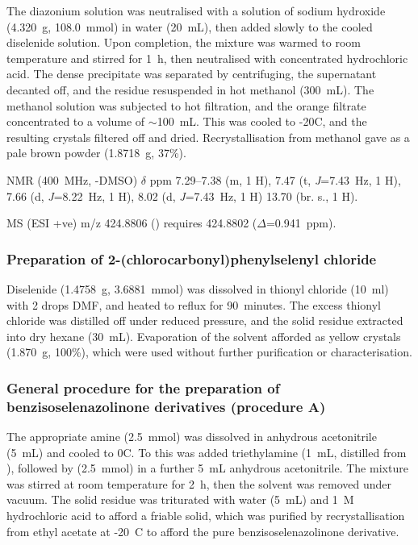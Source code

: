 \begin{refsection}
The diazonium solution was neutralised with a solution of sodium hydroxide (4.320~g, 108.0~mmol) in water (20~mL), then added slowly to the cooled diselenide solution.
Upon completion, the mixture was warmed to room temperature and stirred for 1~h, then neutralised with concentrated hydrochloric acid.
The dense precipitate was separated by centrifuging, the supernatant decanted off, and the residue resuspended in hot methanol (300~mL).
The methanol solution was subjected to hot filtration, and the orange filtrate concentrated to a volume of $\sim$100~mL.
This was cooled to -20\degree C, and the resulting crystals filtered off and dried.
Recrystallisation from methanol gave  as a pale brown powder (1.8718~g, 37\%).

 NMR (400~MHz, -DMSO) $\delta$ ppm
7.29--7.38 (m, 1 H),
7.47 (t, \emph{J}=7.43~Hz, 1 H),
7.66 (d, \emph{J}=8.22~Hz, 1 H),
8.02 (d, \emph{J}=7.43~Hz, 1 H)
13.70 (br. s., 1 H).

MS (ESI +ve) m/z 424.8806 ()  requires 424.8802 ($\Delta$=0.941~ppm).

\subsubsection[Preparation of \refcmpd{dichloride}]{Preparation of 2-(chlorocarbonyl)phenylselenyl chloride }
Diselenide  (1.4758~g, 3.6881~mmol) was dissolved in thionyl chloride (10~ml) with 2 drops DMF, and heated to reflux for 90~minutes.
The excess thionyl chloride was distilled off under reduced pressure, and the solid residue extracted into dry hexane (30~mL).
Evaporation of the solvent afforded  as yellow crystals (1.870~g, 100\%), which were used without further purification or characterisation.

\subsubsection[General procedure for the preparation of benzisoselenazolinone derivatives (procedure A)]{General procedure for the preparation of benzisoselenazolinone derivatives  (procedure A)}
The appropriate amine (2.5~mmol) was dissolved in anhydrous acetonitrile (5~mL) and cooled to 0\degree C.
To this was added triethylamine (1~mL, distilled from ), followed by  (2.5~mmol) in a further 5~mL anhydrous acetonitrile.
The mixture was stirred at room temperature for 2~h, then the solvent was removed under vacuum.
The solid residue was triturated with water (5~mL) and 1~\textsc{M} hydrochloric acid to afford a friable solid, which was purified by recrystallisation from ethyl acetate at -20\degree~C to afford the pure benzisoselenazolinone derivative.


\end{refsection}
